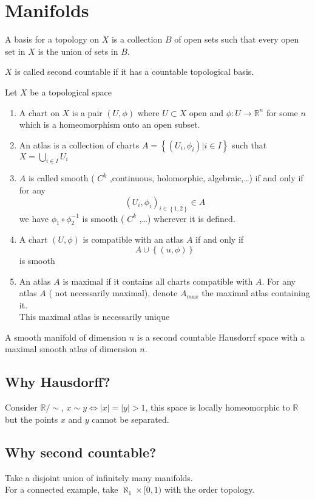 \documentclass[../main.tex]{subfiles}
\begin{document}
\section{Manifolds}
\begin{defn}[Basis]
	A basis for a topology on $X$ is a collection $B$ of open sets such that every open set in $X$ is the union of sets in $B$.\\
\end{defn}
$X$ is called second countable if it has a countable topological basis.
\begin{defn}[Chart]
	Let $X$ be a topological space
	\begin{enumerate}
	\item A chart on $X$ is a  pair  $( U,\phi) $ where $U \subset X$ open and $\phi: U \to \mathbb{R}^{n}$ for some $n$ which is a homeomorphism onto an open subset.
	\item An atlas is a collection of charts $ A= \left\{ ( U_i,\phi_i) |i \in I \right\} $ such that $X= \bigcup_{i \in I} U_i$ 
	\item $A$ is called smooth (  $C^{k}$ ,continuous, holomorphic, algebraic,\ldots) if and only if for any
		\[ 
			( U_i,\phi_i)_{i \in \left\{ 1,2 \right\} } \in A
		\]
		we have $\phi_1\circ\phi_2^{-1}$ is smooth ( $C^{k}$ ,\ldots) wherever it is defined.
	\item A chart $( U,\phi) $  is compatible with an atlas $A$ if and only if 
		\[ 
		A \cup \left\{ ( u,\phi)  \right\} 
		\]
		is smooth
	\item An atlas $A$  is maximal if it contains all charts compatible with $A$.
	For any atlas $A$ ( not necessarily maximal), denote $A_{max} $ the maximal atlas containing it.\\
	This maximal atlas is necessarily unique
	\end{enumerate}
\end{defn}
\begin{defn}[Manifold]
	A smooth manifold of dimension $n$   is a second countable Hausdorrf space with a maximal smooth atlas of dimension $n$.
\end{defn}
\subsection*{Why Hausdorff?}
Consider $ \mathbb{R} /\sim$, $x\sim y \iff |x| = |y| >1$, this space is locally homeomorphic to $\mathbb{R}$ but the points $x$ and $y$ cannot be separated.
\subsection*{Why second countable?}
Take a disjoint union of infinitely many manifolds.\\
For a connected example, take $\aleph_1 \times [ 0,1)$ with the order topology.\\
\end{document}
